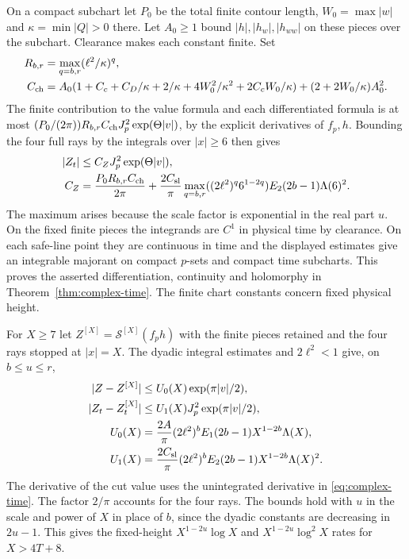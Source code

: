 On a compact subchart let \(P_0\) be the total finite contour
length, \(W_0=\max|w|\) and \(\kappa=\min|Q|>0\) there.
Let \(A_0\ge1\) bound \(|h|,|h_w|,|h_{ww}|\) on these pieces
over the subchart. Clearance makes each constant finite. Set
\[
\begin{split}
 R_{b,r}&=\max_{q=b,r}(\ell^2/\kappa)^q,\\
 C_{\rm ch}&=A_0(1+C_c+C_D/\kappa+2/\kappa+
                     4W_0^2/\kappa^2+2C_cW_0/\kappa)
                        +(2+2W_0/\kappa)A_0^2 .
\end{split}
\]
The finite contribution to the value formula and each
differentiated formula is at most
\((P_0/(2\pi))R_{b,r} C_{\rm ch}J_p^2\exp(\Theta|v|)\),
by the explicit derivatives of \(f_p,h\).
Bounding the four full rays by the integrals over \(|x|\ge6\)
then gives
\begin{equation}
\begin{split}
 |Z_t| &\le C_Z J_p^2\exp(\Theta|v|),\\
 C_Z &=\frac{P_0 R_{b,r} C_{\rm ch}}{2\pi}
   +\frac{2 C_{\rm sl}}{\pi}\max_{q=b,r}((2\ell^2)^q6^{1-2q})
                          E_2(2b-1)\Lambda(6)^2 .
\end{split}
\label{app:chart-time}
\end{equation}
The maximum arises because the scale factor is exponential in
the real part \(u\). On the fixed finite pieces the integrands are
\(C^1\) in physical time by clearance. On each safe-line point
they are continuous in time and the displayed estimates
give an integrable majorant on compact \(p\)-sets and compact
time subcharts. This proves the asserted differentiation,
continuity and holomorphy in Theorem~\ref{thm:complex-time}.
The finite chart constants concern fixed physical height.

For \(X\ge7\) let \(Z^{[X]}=\mathcal S^{[X]}(f_ph)\) with the
finite pieces retained and the four rays stopped at \(|x|=X\).
The dyadic integral estimates and \(2\ell^2<1\) give, on
\(b\le u\le r\),
\begin{equation}
\begin{aligned}
 |Z-Z^{[X]}|&\le U_0(X)\exp(\pi|v|/2),\\
 |Z_t-Z_t^{[X]}|&\le U_1(X)J_p^2\exp(\pi|v|/2),\\
 U_0(X)&=\frac{2A}{\pi}(2\ell^2)^b E_1(2b-1)
                                X^{1-2b}\Lambda(X),\\
 U_1(X)&=\frac{2C_{\rm sl}}{\pi}(2\ell^2)^b E_2(2b-1)
                                X^{1-2b}\Lambda(X)^2 .
\end{aligned}
\label{app:spatial-tails}
\end{equation}
The derivative of the cut value uses the unintegrated
derivative in \eqref{eq:complex-time}. The factor \(2/\pi\)
accounts for the four rays. The bounds hold with \(u\) in
the scale and power of \(X\) in place of \(b\), since the
dyadic constants are decreasing in \(2u-1\). This gives the
fixed-height \(X^{1-2u}\log X\) and \(X^{1-2u}\log^2 X\) rates
for \(X>4T+8\).

